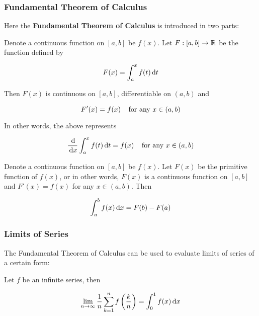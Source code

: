 \documentclass[a4paper,12pt]{article}
\begin{document}
\subsubsection{Fundamental Theorem of Calculus}
\begin{thm}
  Here the \textbf{Fundamental Theorem of Calculus} is introduced in two parts:

  \begin{alist}
    \item Denote a continuous function on $[a,b]$ be $f(x)$. Let $F:[a,b]\to\mathbb{R}$ be the function defined by

    $$F(x)=\int_{a}^{x}f(t)\,\mathrm{d} t$$\s

    Then $F(x)$ is continuous on $[a,b]$, differentiable on $(a,b)$ and

    $$F'(x)=f(x)\;\;\;\;\text{for any }x\in(a,b)$$\s

    In other words, the above represents

    $$\frac{\,\mathrm{d}}{\,\mathrm{d} x}\int_{a}^{x}f(t)\,\mathrm{d} t=f(x)\;\;\;\;\text{for any }x\in(a,b)$$

    \item Denote a continuous function on $[a,b]$ be $f(x)$. Let $F(x)$ be the primitive function of $f(x)$, or in other words, $F(x)$ is a continuous function on $[a,b]$ and $F'(x)=f(x)$ for any $x\in(a,b)$. Then

    $$\int_{a}^{b}f(x)\,\mathrm{d} x=F(b)-F(a)$$
  \end{alist}
\end{thm}

\subsubsection{Limits of Series}
The Fundamental Theorem of Calculus can be used to evaluate limits of series of a certain form:\n

\begin{pst}
  Let $f$ be an infinite series, then

  $$\lim_{n\to\infty}\frac{1}{n}\sum_{k=1}^{n}f\left( \frac{k}{n}\right)=\int_{0}^{1}f(x)\,\mathrm{d} x$$
\end{pst}
\end{document}
